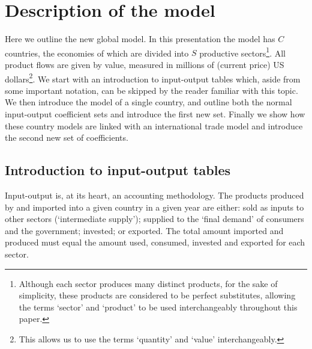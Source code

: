 \documentclass{article}
\begin{document}
\section{Description of the model} \label{sec:system}
Here we outline the new global model.
In this presentation the model has $C$ countries, the economies of which are divided into $S$ productive sectors\footnote{Although each sector produces many distinct products, for the sake of simplicity, these products are considered to be perfect substitutes, allowing the terms `sector' and `product' to be used interchangeably throughout this paper.}.
All product flows are given by value, measured in millions of (current price) US dollars\footnote{This allows us to use the terms `quantity' and `value' interchangeably.}.
We start with an introduction to input-output tables which, aside from some important notation, can be skipped by the reader familiar with this topic.
We then introduce the model of a single country, and outline both the normal input-output coefficient sets and introduce the first new set.
Finally we show how these country models are linked with an international trade model and introduce the second new set of coefficients.

\subsection{Introduction to input-output tables} \label{sec:iots}
Input-output is, at its heart, an accounting methodology.
The products produced by and imported into a given country in a given year are either: sold as inputs to other sectors (`intermediate supply'); supplied to the `final demand' of consumers and the government; invested; or exported.
The total amount imported and produced must equal the amount used, consumed, invested and exported for each sector.
\end{document}
